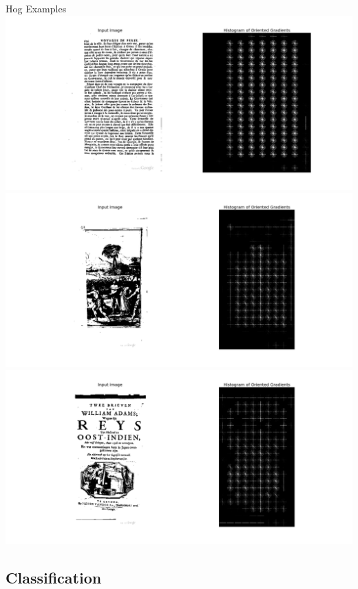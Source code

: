 \documentclass{beamer}
\begin{document}
\begin{frame}[allowframebreaks]{Hog Examples}
	\includegraphics[trim=200px 0px 100px 0px, clip=true, width=.8\paperwidth]{resources/text1}\\
\framebreak
	\includegraphics[trim=200px 0px 100px 0px, clip=true, width=.8\paperwidth]{resources/image1}\\
\framebreak
	\includegraphics[trim=200px 0px 100px 0px, clip=true, width=.8\paperwidth]{resources/text_and_image1}
\end{frame}


\subsection{Classification}
\end{document}
